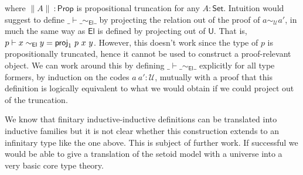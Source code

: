 \documentclass{easychair}
\newcommand{\setoidU}{\mathcal{U}}
\newcommand{\ad}[1]{\AgdaFunction{#1}}
\newcommand{\Set}{\textsf{Set}}
\newcommand{\Prop}{\textsf{Prop}}
\newcommand{\U}{\textsf{U}}
\newcommand{\El}{\textsf{El}}
\begin{document}
where $\parallel A \parallel\ : \Prop$ is propositional truncation for any $A :
\Set$. Intuition would suggest to define $\_\vdash\_\sim_{\El}\_$ by projecting
the relation out of the proof of $a \sim_{\setoidU} a'$, in much the same way as
$\El$ is defined by projecting out of $\U$. That is, $p \vdash x \sim_{\El} y =
\ad{proj}_1\ p\ x\ y$.
%
However, this doesn't work since the type of $p$ is propositionally truncated,
hence it cannot be used to construct a proof-relevant object. We can work around
this by defining $\_\vdash\_\sim_{\El}\_$ explicitly for all type formers, by
induction on the codes $a\ a' : \setoidU$, mutually with a proof that this
definition is logically equivalent to what we would obtain if we could project
out of the truncation.

We know that finitary inductive-inductive definitions can be translated into
inductive families \cite{iit-erasure,iit-to-ix,induction-is-enough} but it is
not clear whether this construction extends to an infinitary type like the one
above. This is subject of further work. If successful we would be able to give a
translation of the setoid model with a universe into a very basic core type
theory.



\end{document}
